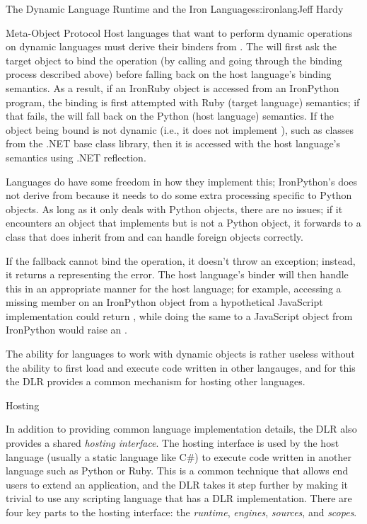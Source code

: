 \begin{aosachapter}{The Dynamic Language Runtime and the Iron Languages}{s:ironlang}{Jeff Hardy}
\begin{aosasect1}{Meta-Object Protocol}
Host languages that want to perform dynamic operations on dynamic languages
must derive their binders from . The
 will first ask the target object to bind the
operation (by calling  and going through the binding
process described above) before falling back on the host language's binding
semantics. As a result, if an IronRuby object is accessed from an IronPython
program, the binding is first attempted with Ruby (target language) semantics;
if that fails, the  will fall back on the Python
(host language) semantics. If the object being bound is not dynamic (i.e., it
does not implement ), such as classes from the
.NET base class library, then it is accessed with the host language's semantics
using .NET reflection.

Languages do have some freedom in how they implement this; IronPython's
 does not derive from  because it
needs to do some extra processing specific to Python objects. As long as it
only deals with Python objects, there are no issues; if it encounters an object
that implements  but is not a Python object,
it forwards to a  class that does inherit from
 and can handle foreign objects correctly.

If the fallback cannot bind the operation, it doesn't throw an
exception; instead, it returns a  representing the
error. The host language's binder will then handle this in an appropriate
manner for the host language; for example, accessing a missing member on an
IronPython object from a hypothetical JavaScript implementation could return
, while doing the same to a JavaScript object from IronPython
would raise an .

The ability for languages to work with dynamic objects is rather useless
without the ability to first load and execute code written in other langauges,
and for this the DLR provides a common mechanism for hosting other languages.

\end{aosasect1}

\begin{aosasect1}{Hosting}

In addition to providing common language implementation details, the DLR also
provides a shared \emph{hosting interface}. The hosting interface is used by
the host language (usually a static language like C\#) to execute code written
in another language such as Python or Ruby. This is a common technique that
allows end users to extend an application, and the DLR takes it step further by
making it trivial to use any scripting language that has a DLR implementation.
There are four key parts to the hosting interface: the \emph{runtime}, 
\emph{engines}, \emph{sources},  and \emph{scopes}.


\end{aosasect1}
\end{aosachapter}
